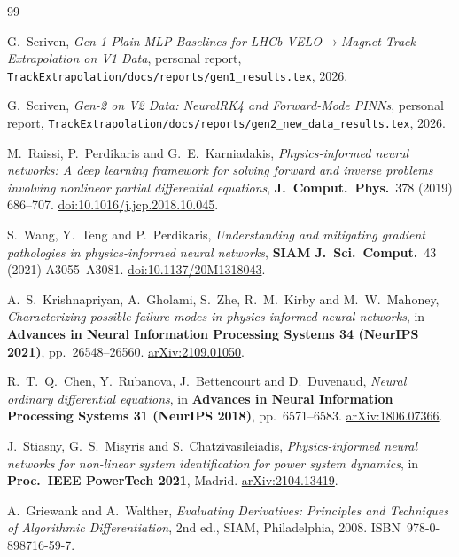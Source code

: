 \documentclass[a4paper,11pt]{article}
\begin{document}
\begin{thebibliography}{99}

G.~Scriven, \emph{Gen-1 Plain-MLP Baselines for LHCb VELO$\to$Magnet
Track Extrapolation on V1 Data}, personal report,
\texttt{TrackExtrapolation/docs/reports/gen1\_results.tex}, 2026.

G.~Scriven, \emph{Gen-2 on V2 Data: NeuralRK4 and Forward-Mode PINNs},
personal report,
\texttt{TrackExtrapolation/docs/reports/gen2\_new\_data\_results.tex},
2026.

M.~Raissi, P.~Perdikaris and G.~E.~Karniadakis,
\emph{Physics-informed neural networks: A deep learning framework for
solving forward and inverse problems involving nonlinear partial
differential equations}, \textbf{J.~Comput.~Phys.}~378 (2019) 686--707.
\href{https://doi.org/10.1016/j.jcp.2018.10.045}{doi:10.1016/j.jcp.2018.10.045}.

S.~Wang, Y.~Teng and P.~Perdikaris,
\emph{Understanding and mitigating gradient pathologies in
physics-informed neural networks},
\textbf{SIAM J.~Sci.~Comput.}~43 (2021) A3055--A3081.
\href{https://doi.org/10.1137/20M1318043}{doi:10.1137/20M1318043}.

A.~S.~Krishnapriyan, A.~Gholami, S.~Zhe, R.~M.~Kirby and M.~W.~Mahoney,
\emph{Characterizing possible failure modes in physics-informed neural
networks}, in \textbf{Advances in Neural Information Processing Systems
34 (NeurIPS 2021)}, pp.~26548--26560.
\href{https://arxiv.org/abs/2109.01050}{arXiv:2109.01050}.

R.~T.~Q.~Chen, Y.~Rubanova, J.~Bettencourt and D.~Duvenaud,
\emph{Neural ordinary differential equations}, in \textbf{Advances in
Neural Information Processing Systems 31 (NeurIPS 2018)},
pp.~6571--6583.
\href{https://arxiv.org/abs/1806.07366}{arXiv:1806.07366}.

J.~Stiasny, G.~S.~Misyris and S.~Chatzivasileiadis,
\emph{Physics-informed neural networks for non-linear system
identification for power system dynamics}, in
\textbf{Proc.~IEEE PowerTech 2021}, Madrid.
\href{https://arxiv.org/abs/2104.13419}{arXiv:2104.13419}.

A.~Griewank and A.~Walther,
\emph{Evaluating Derivatives: Principles and Techniques of Algorithmic
Differentiation}, 2nd ed., SIAM, Philadelphia, 2008.
ISBN~978-0-898716-59-7.


\end{thebibliography}
\end{document}
